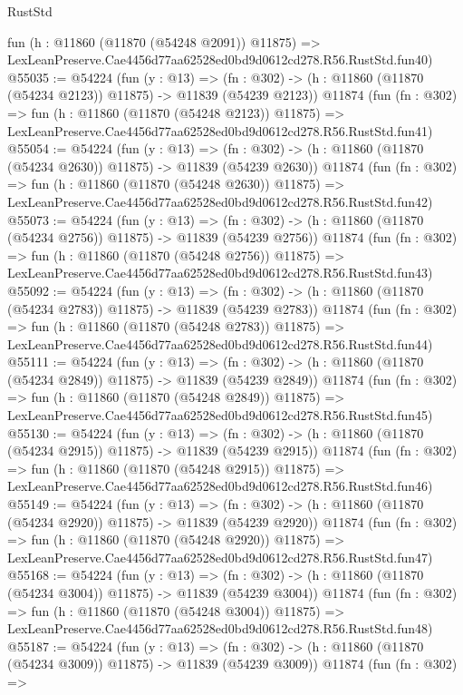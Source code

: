 \begin{lexlean}{RustStd}
\begin{coremodule}
    fun (h : @11860 (@11870 (@54248 @2091)) @11875) =>
    LexLeanPreserve.Cae4456d77aa62528ed0bd9d0612cd278.R56.RustStd.fun40)
@55035 := @54224
    (fun (y : @13) =>
    (fn : @302) -> (h : @11860 (@11870 (@54234 @2123)) @11875) -> @11839 (@54239 @2123))
    @11874
    (fun (fn : @302) =>
    fun (h : @11860 (@11870 (@54248 @2123)) @11875) =>
    LexLeanPreserve.Cae4456d77aa62528ed0bd9d0612cd278.R56.RustStd.fun41)
@55054 := @54224
    (fun (y : @13) =>
    (fn : @302) -> (h : @11860 (@11870 (@54234 @2630)) @11875) -> @11839 (@54239 @2630))
    @11874
    (fun (fn : @302) =>
    fun (h : @11860 (@11870 (@54248 @2630)) @11875) =>
    LexLeanPreserve.Cae4456d77aa62528ed0bd9d0612cd278.R56.RustStd.fun42)
@55073 := @54224
    (fun (y : @13) =>
    (fn : @302) -> (h : @11860 (@11870 (@54234 @2756)) @11875) -> @11839 (@54239 @2756))
    @11874
    (fun (fn : @302) =>
    fun (h : @11860 (@11870 (@54248 @2756)) @11875) =>
    LexLeanPreserve.Cae4456d77aa62528ed0bd9d0612cd278.R56.RustStd.fun43)
@55092 := @54224
    (fun (y : @13) =>
    (fn : @302) -> (h : @11860 (@11870 (@54234 @2783)) @11875) -> @11839 (@54239 @2783))
    @11874
    (fun (fn : @302) =>
    fun (h : @11860 (@11870 (@54248 @2783)) @11875) =>
    LexLeanPreserve.Cae4456d77aa62528ed0bd9d0612cd278.R56.RustStd.fun44)
@55111 := @54224
    (fun (y : @13) =>
    (fn : @302) -> (h : @11860 (@11870 (@54234 @2849)) @11875) -> @11839 (@54239 @2849))
    @11874
    (fun (fn : @302) =>
    fun (h : @11860 (@11870 (@54248 @2849)) @11875) =>
    LexLeanPreserve.Cae4456d77aa62528ed0bd9d0612cd278.R56.RustStd.fun45)
@55130 := @54224
    (fun (y : @13) =>
    (fn : @302) -> (h : @11860 (@11870 (@54234 @2915)) @11875) -> @11839 (@54239 @2915))
    @11874
    (fun (fn : @302) =>
    fun (h : @11860 (@11870 (@54248 @2915)) @11875) =>
    LexLeanPreserve.Cae4456d77aa62528ed0bd9d0612cd278.R56.RustStd.fun46)
@55149 := @54224
    (fun (y : @13) =>
    (fn : @302) -> (h : @11860 (@11870 (@54234 @2920)) @11875) -> @11839 (@54239 @2920))
    @11874
    (fun (fn : @302) =>
    fun (h : @11860 (@11870 (@54248 @2920)) @11875) =>
    LexLeanPreserve.Cae4456d77aa62528ed0bd9d0612cd278.R56.RustStd.fun47)
@55168 := @54224
    (fun (y : @13) =>
    (fn : @302) -> (h : @11860 (@11870 (@54234 @3004)) @11875) -> @11839 (@54239 @3004))
    @11874
    (fun (fn : @302) =>
    fun (h : @11860 (@11870 (@54248 @3004)) @11875) =>
    LexLeanPreserve.Cae4456d77aa62528ed0bd9d0612cd278.R56.RustStd.fun48)
@55187 := @54224
    (fun (y : @13) =>
    (fn : @302) -> (h : @11860 (@11870 (@54234 @3009)) @11875) -> @11839 (@54239 @3009))
    @11874
    (fun (fn : @302) =>

\end{coremodule}
\end{lexlean}
